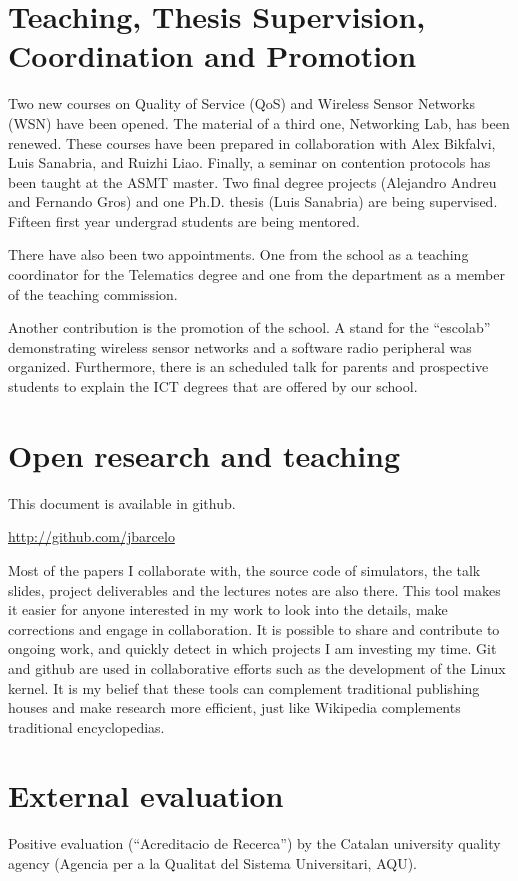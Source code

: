 \documentclass[a4paper,twocolumns]{article}%
\begin{document}
\section{Teaching, Thesis Supervision, Coordination and Promotion}

Two new courses on Quality of Service (QoS) and Wireless Sensor Networks (WSN) have been opened.
The material of a third one, Networking Lab, has been renewed.
These courses have been prepared in collaboration with Alex Bikfalvi, Luis Sanabria, and Ruizhi Liao.
Finally, a seminar on contention protocols has been taught at the ASMT master.
Two final degree projects (Alejandro Andreu and Fernando Gros) and one Ph.D. thesis (Luis Sanabria) are being supervised.
Fifteen first year undergrad students are being mentored.

There have also been two appointments.
One from the school as a teaching coordinator for the Telematics degree and one from the department as a member of the teaching commission.

Another contribution is the promotion of the school.
A stand for the ``escolab'' demonstrating wireless sensor networks and a software radio peripheral was organized.
Furthermore, there is an scheduled talk for parents and prospective students to explain the ICT degrees that are offered by our school.


\section{Open research and teaching}

This document is available in github.

\url{http://github.com/jbarcelo}

Most of the papers I collaborate with, the source code of simulators, the talk slides, project deliverables and the lectures notes are also there.
This tool makes it easier for anyone interested in my work to look into the details, make corrections and engage in collaboration.
It is possible to share and contribute to ongoing work, and quickly detect in which projects I am investing my time.
Git and github are used in collaborative efforts such as the development of the Linux kernel.
It is my belief that these tools can complement traditional publishing houses and make research more efficient, just like Wikipedia complements traditional encyclopedias. 

\section{External evaluation}

Positive evaluation (``Acreditacio de Recerca'') by the Catalan university quality agency (Agencia per a la Qualitat del Sistema Universitari, AQU).




\end{document}
